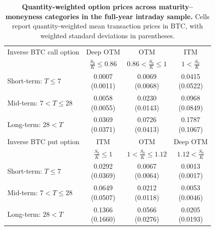 \documentclass[11pt]{article}
\begin{document}
\begin{table}
\centering

\begin{tabular}{lccc}
\hline
Inverse BTC call option & Deep OTM & OTM & ITM  \\
 & $\frac{S_0}{K} \leq 0.86$ & $0.86 < \frac{S_0}{K} \leq 1$ & $1 < \frac{S_0}{K}$  \\
\hline
Short-term: $T \leq 7$ & \makecell{0.0007\\(0.0011)} & \makecell{0.0069\\(0.0068)} & \makecell{0.0415\\(0.0522)} \\
Mid-term: $7 < T \leq 28$ & \makecell{0.0058\\(0.0055)} & \makecell{0.0230\\(0.0143)} & \makecell{0.0968\\(0.0849)} \\
Long-term: $28 < T$ & \makecell{0.0369\\(0.0371)} & \makecell{0.0726\\(0.0413)} & \makecell{0.1787\\(0.1067)} \\
\hline
Inverse BTC put option & ITM & OTM & Deep OTM \\
 & $\frac{S_0}{K} \leq 1$ & $1 < \frac{S_0}{K} \leq 1.12$ &  $1.12 < \frac{S_0}{K}$ \\
\hline
Short-term: $T \leq 7$ & \makecell{0.0292\\(0.0369)} & \makecell{0.0067\\(0.0064)} & \makecell{0.0013\\(0.0017)} \\
Mid-term: $7 < T \leq 28$ & \makecell{0.0649\\(0.0507)} & \makecell{0.0212\\(0.0118)} & \makecell{0.0053\\(0.0046)} \\
Long-term: $28 < T$ & \makecell{0.1366\\(0.1660)} & \makecell{0.0566\\(0.0276)} & \makecell{0.0205\\(0.0193)} \\
\hline
\end{tabular}
\caption{\textbf{Quantity-weighted option prices across maturity--moneyness categories in the full-year intraday sample.} Cells report quantity-weighted mean transaction prices in BTC, with weighted standard deviations in parentheses.}
\label{tab:appendix_full_year_weighted_option_prices}
\end{table}
\end{document}
